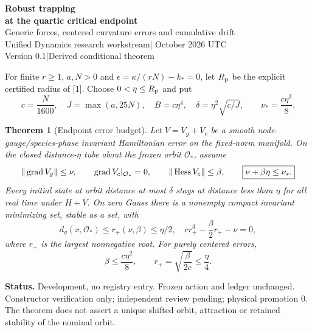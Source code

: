 \documentclass[11pt,a4paper]{article}
\newtheorem{theorem}{Theorem}\newtheorem{lemma}[theorem]{Lemma}
\begin{document}
\begin{center}
{\Large\bfseries Robust trapping\\at the quartic critical endpoint}\\[10pt]
{\large Generic forces, centered curvature errors and cumulative drift}\\[10pt]
Unified Dynamics research workstream\quad | October 2026 UTC\\
Version 0.1\quad |\quad Derived conditional theorem
\end{center}
\begin{abstract}
The critical endpoint has quartic restoring energy rather than a positive normal Hessian in all directions. We derive an explicit model-error budget from its certified nonlinear tube. Generic gradient errors consume a cubic-in-radius budget, whereas centered errors with zero gradient on the nominal orbit consume a quadratic curvature budget. Static errors yield a nearby compact invariant minimizing set with an explicit cubic-root localization; centered errors improve this to a square-root bound. Cumulative gradient variation gives a time-dependent guarantee. Typed coefficient and loop-readout requirements are supplied. A stiffness increase can satisfy the trapping budget while destabilizing the exact nominal orbit, so trapping and persistence of nominal stability are kept distinct.
\end{abstract}
For finite $r\ge1$, $a,N>0$ and $\epsilon=\kappa/(rN)-k_*=0$, let $R_{\rm p}$ be the explicit certified radius of [1]. Choose $0<\eta\le R_{\rm p}$ and put
\[
c=\frac N{1600},\quad J=\max(a,25N),\quad B=c\eta^4,\quad
\delta=\eta^2\sqrt{c/J},\qquad \nu_* =\frac{c\eta^3}{8}.
\]
\begin{theorem}[Endpoint error budget]\label{th:main}
Let $V=V_g+V_c$ be a smooth node-gauge/species-phase invariant Hamiltonian error on the fixed-norm manifold. On the closed distance-$\eta$ tube about the frozen orbit $\mathcal O_*$, assume
\[
\|\operatorname{grad} V_g\|\le\nu,\qquad
\operatorname{grad} V_c|_{\mathcal O_*}=0,\qquad
\|\operatorname{Hess}V_c\|\le\beta,\qquad
\boxed{\nu+\beta\eta\le\nu_* .}
\]
Every initial state at orbit distance at most $\delta$ stays at distance less than $\eta$ for all real time under $H+V$. On zero Gauss there is a nonempty compact invariant minimizing set, stable as a set, with
\[
d_g(x,\mathcal O_*)\le r_+(\nu,\beta)\le\eta/2,
\quad c r_+^3-\frac\beta2r_+-\nu=0,
\]
where $r_+$ is the largest nonnegative root. For purely centered errors,
\[
\boxed{\beta\le\frac{c\eta^2}{8},\qquad
r_+=\sqrt{\frac{\beta}{2c}}\le\frac\eta4.}
\]
\end{theorem}
\textbf{Status.} Development, no registry entry. Frozen action and ledger unchanged. Constructor verification only; independent review pending; physical promotion $0$. The theorem does not assert a unique shifted orbit, attraction or retained stability of the nominal orbit.
\newpage
\end{document}
